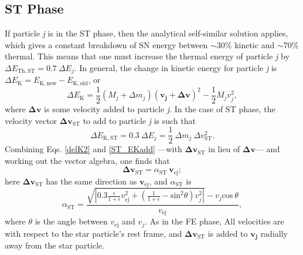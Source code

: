 \documentclass[iop]{emulateapj}
\begin{document}
\subsection{ST Phase}
If particle \textit{j} is in the ST phase, then the analytical self-similar solution applies, which gives a constant breakdown of SN energy between $\sim$30\% kinetic and $\sim$70\% thermal. This means that one must increase the thermal energy of particle \textit{j} by $\Delta E_{\mathrm{Th,ST}} = 0.7\ \Delta E_j$. In general, the change in kinetic energy for particle \textit{j} is $\Delta E_{\mathrm{K}} = E_{\mathrm{K,new}} - E_{\mathrm{K,old}}$, or
\begin{equation}\label{delK2}
\Delta E_{\mathrm{K}} = \frac{1}{2}(M_j+\Delta m_j)(\boldsymbol{v_j} + \boldsymbol{\Delta v})^2 - \frac{1}{2}M_jv_j^2,
\end{equation}
where $\boldsymbol{\Delta v}$ is some velocity added to particle \textit{j}. In the case of ST phase, the velocity vector $\boldsymbol{\Delta v_{\mathrm{ST}}}$ to add to particle \textit{j} is such that
\begin{equation}\label{ST_EKadd}
\Delta E_{\mathrm{K,ST}} = 0.3\ \Delta E_j = \frac{1}{2}\ \Delta m_j\ \Delta v_{\mathrm{ST}}^2.
\end{equation}
Combining Eqs. \ref{delK2} and \ref{ST_EKadd} ---with $\boldsymbol{\Delta v_{\mathrm{ST}}}$ in lieu of $\boldsymbol{\Delta v}$--- and working out the vector algebra, one finds that 
\begin{equation}\label{ST_vadd}
\boldsymbol{\Delta v_{\mathrm{ST}}} = \alpha_{\mathrm{ST}}\ \boldsymbol{v_{\mathrm{ej}}};
\end{equation}
here $\boldsymbol{\Delta v_{\mathrm{ST}}}$ has the same direction as $\boldsymbol{v_{\mathrm{ej}}}$, and $\alpha_{\mathrm{ST}}$ is
\begin{equation}\label{alpha_st}
\alpha_{\mathrm{ST}} = \frac{\sqrt{|0.3\frac{\epsilon}{1+\epsilon}v_{\mathrm{ej}}^2 + (\frac{1}{1+\epsilon}- \mathrm{sin}^2\theta)v_j^2|} - v_j\mathrm{cos}\ \theta}{v_{\mathrm{ej}}},
\end{equation}
where $\theta$ is the angle between $v_{\mathrm{ej}}$ and $v_j$. As in the FE phase, All velocities are with respect to the star particle's rest frame, and $\boldsymbol{\Delta v_{\mathrm{ST}}}$ is added to $\boldsymbol{v_j}$ radially away from the star particle.
\end{document}
